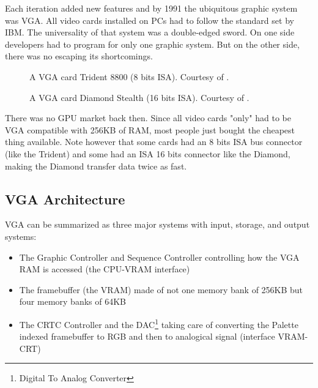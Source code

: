 \documentclass[book.tex]{subfiles}
\begin{document}
Each iteration added new features and by 1991 the ubiquitous graphic system was VGA. All video cards installed on PCs had to follow the standard set by IBM. The universality of that system was a double-edged sword. On one side developers had to program for only one graphic system. But on the other side, there was no escaping its shortcomings.\\

\begin{figure}[H] 
  \centering 
  \caption{A VGA card Trident 8800 (8 bits ISA). Courtesy of .}
\end{figure}
\par
\begin{figure}[H] 
  \centering 
  \caption{A VGA card Diamond Stealth (16 bits ISA). Courtesy of .}
\end{figure}
 There was no GPU market back then. Since all video cards "only" had to be VGA compatible with 256KB of RAM, most people just bought the cheapest thing available. Note however that some cards had an 8 bits ISA bus connector (like the Trident) and some had an ISA 16 bits connector like the Diamond, making the Diamond transfer data twice as fast.\\
\par




\subsection{VGA Architecture}

VGA can be summarized as three major systems with input, storage, and output systems:\\

\begin{itemize}
\item The Graphic Controller and Sequence Controller controlling how the VGA RAM is accessed (the CPU-VRAM interface)
\item The framebuffer (the VRAM) made of not one memory bank of 256KB but four memory banks of 64KB
\item The CRTC Controller and the DAC\footnote{Digital To Analog Converter} taking care of converting the Palette indexed framebuffer to RGB and then to analogical signal (interface VRAM-CRT)
\end{itemize}
\end{document}
